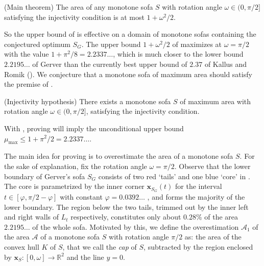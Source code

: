 \begin{theorem}

(Main theorem) The area of any monotone sofa \(S\) with rotation angle \(\omega \in (0, \pi/2]\) satisfying the injectivity condition is at most \(1 + \omega^2/2\).

\label{thm:main}
\end{theorem}

So the upper bound of  is effective on a domain of monotone sofas containing the conjectured optimum \(S_G\). The upper bound \(1 + \omega^2/2\) of  maximizes at \(\omega = \pi/2\) with the value \(1 + \pi^2/8 = 2.2337\dots\), which is much closer to the lower bound \(2.2195\dots\) of Gerver than the currently best upper bound of \(2.37\) of Kallus and Romik (). We conjecture that a monotone sofa of maximum area should satisfy the premise of .

\begin{conjecture}

(Injectivity hypothesis) There exists a monotone sofa \(S\) of maximum area with rotation angle \(\omega \in (0, \pi/2]\), satisfying the injectivity condition.

\label{con:injectivity}
\end{conjecture}

With , proving  will imply the unconditional upper bound \(\mu_{\max} \leq 1 + \pi^2/2 = 2.2337\dots\).

The main idea for proving  is to overestimate the area of a monotone sofa \(S\). For the sake of explanation, fix the rotation angle \(\omega = \pi/2\). Observe that the lower boundary of Gerver’s sofa \(S_G\) consists of two red ‘tails’ and one blue ‘core’ in . The core is parametrized by the inner corner \(\mathbf{x}_{S_G}(t)\) for the interval \(t \in [\varphi, \pi/2 - \varphi]\) with constant \(\varphi = 0.0392\dots\) \autocite{romikDifferentialEquationsExact2018}, and forms the majority of the lower boundary. The region below the two tails, trimmed out by the inner left and right walls of \(L_t\) respectively, constitutes only about \(0.28 \%\) of the area \(2.2195\dots\) of the whole sofa. Motivated by this, we define the overestimation \(\mathcal{A}_1\) of the area \(\mathcal{A}\) of a monotone sofa \(S\) with rotation angle \(\pi/2\) as: the area of the convex hull \(K\) of \(S\), that we call the \emph{cap} of \(S\), subtracted by the region enclosed by \(\mathbf{x}_S : [0, \omega] \to \mathbb{R}^2\) and the line \(y=0\).

